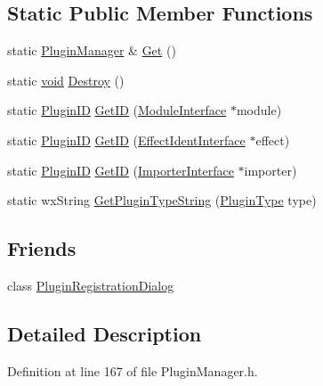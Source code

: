 \subsection*{Static Public Member Functions}
\begin{DoxyCompactItemize}
\item 
static \hyperlink{class_plugin_manager}{Plugin\+Manager} \& \hyperlink{class_plugin_manager_aeea97bed99a6b179dd87dc6fbf1086f7}{Get} ()
\item 
static \hyperlink{sound_8c_ae35f5844602719cf66324f4de2a658b3}{void} \hyperlink{class_plugin_manager_ab353dded5cbfb53b81d4d5bc29b94ef7}{Destroy} ()
\item 
static \hyperlink{include_2audacity_2_types_8h_abe9b737fcebc2b5bea606246e1eab52e}{Plugin\+ID} \hyperlink{class_plugin_manager_a067694d95ce2e8de430423083d313a46}{Get\+ID} (\hyperlink{class_module_interface}{Module\+Interface} $\ast$module)
\item 
static \hyperlink{include_2audacity_2_types_8h_abe9b737fcebc2b5bea606246e1eab52e}{Plugin\+ID} \hyperlink{class_plugin_manager_ae5268465836ca300ca2f18628e45a56c}{Get\+ID} (\hyperlink{class_effect_ident_interface}{Effect\+Ident\+Interface} $\ast$effect)
\item 
static \hyperlink{include_2audacity_2_types_8h_abe9b737fcebc2b5bea606246e1eab52e}{Plugin\+ID} \hyperlink{class_plugin_manager_a437d551770448d9164806af219fd2ff3}{Get\+ID} (\hyperlink{class_importer_interface}{Importer\+Interface} $\ast$importer)
\item 
static wx\+String \hyperlink{class_plugin_manager_aca92b54315d16c289e450017a082e482}{Get\+Plugin\+Type\+String} (\hyperlink{_plugin_manager_8h_a54e0db21fd49ff6e0178b6ebe120a6d2}{Plugin\+Type} type)
\end{DoxyCompactItemize}
\subsection*{Friends}
\begin{DoxyCompactItemize}
\item 
class \hyperlink{class_plugin_manager_a618e36ac09e28a795a6f15bc12891e95}{Plugin\+Registration\+Dialog}
\end{DoxyCompactItemize}


\subsection{Detailed Description}


Definition at line 167 of file Plugin\+Manager.\+h.



